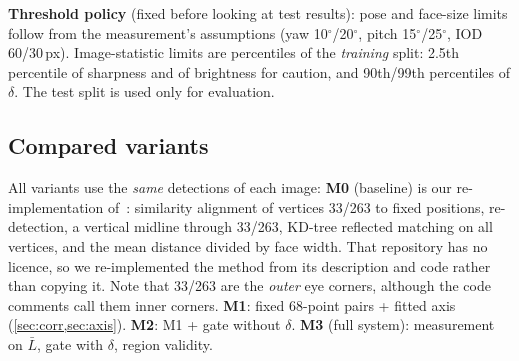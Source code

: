 \textbf{Threshold policy} (fixed before looking at test results): pose and face-size limits
follow from the measurement's assumptions (yaw 10$^\circ$/20$^\circ$, pitch 15$^\circ$/25$^\circ$,
IOD 60/30\,px). Image-statistic limits are percentiles of the \emph{training} split: 2.5th
percentile of sharpness and of brightness for caution, and 90th/99th percentiles of
$\delta$. The test split is used only for evaluation.

\begin{table}[t]
\centering\footnotesize
\resizebox{\linewidth}{!}{}
\caption{\textbf{Gate thresholds} (\texttt{configs/gate\_thresholds.json}).
``train pct.'': percentile of the \nTrainOk{} LFPW training faces.}
\label{tab:thresholds}
\end{table}

\subsection{Compared variants}
\label{sec:variants}
All variants use the \emph{same} detections of each image:
\textbf{M0} (baseline) is our re-implementation of~\cite{nashokan_facialasymmetry}: similarity
alignment of vertices 33/263 to fixed positions, re-detection, a vertical midline through
33/263, KD-tree reflected matching on all vertices, and the mean distance divided by face
width. That repository has no licence, so we re-implemented the method from its
description and code rather than copying it. Note that 33/263 are the \emph{outer} eye
corners, although the code comments call them inner corners.
\textbf{M1}: fixed 68-point pairs + fitted axis (\cref{sec:corr,sec:axis}).
\textbf{M2}: M1 + gate without $\delta$.
\textbf{M3} (full system): measurement on $\bar L$, gate with $\delta$, region validity.
